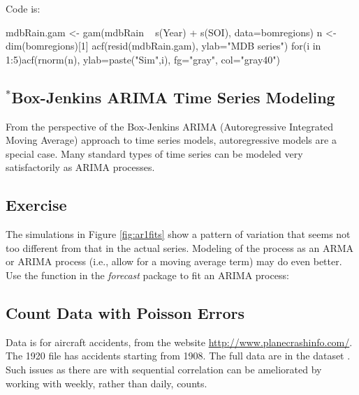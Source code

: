 Code is:
\begin{Schunk}
\begin{Sinput}
mdbRain.gam <- gam(mdbRain ~ s(Year) + s(SOI),
                   data=bomregions)
n <-  dim(bomregions)[1]
acf(resid(mdbRain.gam), ylab="MDB series")
for(i in 1:5)acf(rnorm(n), ylab=paste("Sim",i),
                 fg="gray", col="gray40")
\end{Sinput}
\end{Schunk}

\subsection{$^*$Box-Jenkins ARIMA Time Series Modeling}

From the perspective of the Box-Jenkins ARIMA (Autoregressive
Integrated Moving Average) approach to time series models,
autoregressive models are a special case.  Many standard types of time
series can be modeled very satisfactorily as ARIMA processes.

\subsection*{Exercise}
The simulations in Figure \ref{fig:ar1fits} show a pattern of
  variation that seems not too different from that in the actual series.
  Modeling of the process as an ARMA or ARIMA process (i.e., allow
  for a moving average term) may do even better.  Use the
   function in the {\em forecast} package to fit an
  ARIMA process:

\subsection{Count Data with Poisson Errors}


Data is for aircraft accidents, from the website
\url{http://www.planecrashinfo.com/}.  The 1920 file has
accidents starting from 1908. The full data are in the
dataset .
Such issues as there are with sequential correlation
can be ameliorated by working with weekly, rather than daily,
counts. 



